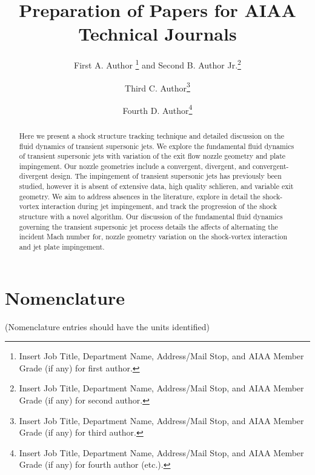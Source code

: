 \documentclass[journal]{new-aiaa}
\title{Preparation of Papers for AIAA Technical Journals}
\author{First A. Author \footnote{Insert Job Title, Department Name, Address/Mail Stop, and AIAA Member Grade (if any) for first author.} and Second B. Author Jr.\footnote{Insert Job Title, Department Name, Address/Mail Stop, and AIAA Member Grade (if any) for second author.}}
\affil{Business or Academic Affiliation 1, City, State, Zip Code}
\author{Third C. Author\footnote{Insert Job Title, Department Name, Address/Mail Stop, and AIAA Member Grade (if any) for third author.}}
\affil{Business or Academic Affiliation 2, City, Province, Zip Code, Country}
\author{Fourth D. Author\footnote{Insert Job Title, Department Name, Address/Mail Stop, and AIAA Member Grade (if any) for fourth author (etc.).}}
\affil{Business or Academic Affiliation 2, City, State, Zip Code}
\begin{document}
\maketitle

\begin{abstract}
Here we present a shock structure tracking technique and detailed discussion on the fluid dynamics of transient supersonic jets. We explore the fundamental fluid dynamics of transient supersonic jets with variation of the exit flow nozzle geometry and plate impingement. Our nozzle geometries include a convergent, divergent, and convergent-divergent design. The impingement of transient supersonic jets has previously been studied, however it is absent of extensive data, high quality schlieren, and variable exit geometry. We aim to address absences in the literature, explore in detail the shock-vortex interaction during jet impingement, and track the progression of the shock structure with a novel algorithm. Our discussion of the fundamental fluid dynamics governing the transient supersonic jet process details the affects of alternating the incident Mach number for, nozzle geometry variation on the shock-vortex interaction and jet plate impingement.
\end{abstract}

\section*{Nomenclature}

\noindent(Nomenclature entries should have the units identified)
\end{document}
